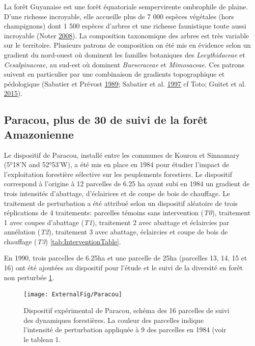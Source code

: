 \documentclass[11pt,french,A4paper,extrafontsizes,onecolumn,openright]{memoir}
\begin{document}
La forêt Guyanaise est une forêt équatoriale sempervirente ombrophile de
plaine. D'une richesse incroyable, elle accueille plus de 7 000 espèces
végétales (hors champignons) dont 1 500 espèces d'arbres et une richesse
faunistique toute aussi incroyable (Noter
\protect\hyperlink{ref-DeNoter2008}{2008}). La composition taxonomique
des arbres est très variable sur le territoire. Plusieurs patrons de
composition on été mis en évidence selon un gradient du nord-ouest où
dominent les familles botaniques des \emph{Lecythidaceae} et
\emph{Cesalpinaceae}, au sud-est où dominent \emph{Burseraceae} et
\emph{Mimosaceae}. Ces patrons suivent en particulier par une
combinaison de gradients topographique et pédologique (Sabatier et
Prévost \protect\hyperlink{ref-Sabatier1989}{1989}; Sabatier et al.
\protect\hyperlink{ref-Sabatier1997}{1997} cf Toto; Guitet et al.
\protect\hyperlink{ref-Guitet2015}{2015}).

\subsection{Paracou, plus de 30 de suivi de la forêt
Amazonienne}\label{paracou-plus-de-30-de-suivi-de-la-foret-amazonienne}

Le dispositif de Paracou, installé entre les communes de Kourou et
Sinnamary (5°18'N and 52°53'W), a été mis en place en 1984 pour étudier
l'impact de l'exploitation forestière sélective sur les peuplements
forestiers. Le dispositif correspond à l'origine à 12 parcelles de 6.25
ha ayant subi en 1984 un gradient de trois intensités d'abattage,
d'éclairices et de coupe de bois de chauffage. Le traitement de
perturbation a été attribué selon un dispositif aléatoire de trois
réplications de 4 traitements: parcelles témoins sans intervention
(\emph{T0}), traitement 1 avec coupes d'abattage (\emph{T1}), traitement
2 avec abattage et éclaircies par annélation (\emph{T2}), traitement 3
avec abattage, éclaircies et coupe de bois de chauffage (\emph{T3})
\ref{tab:InterventionTable}.

En 1990, trois parcelles de 6.25ha et une parcelle de 25ha (parcelles
13, 14, 15 et 16) ont été ajoutées au dispositif pour l'étude et le
suivi de la diversité en forêt non perturbée \ref{fig:ParacouDesign}.

\begin{figure}

{\centering \texttt{[image: ExternalFig/Paracou]} 

}

\caption{Dispositif expérimental de Paracou, schéma des 16 parcelles de suivi des dynamiques forestières. La couleur des parcelles indique l'intensité de perturbation appliquée à 9 des parcelles en 1984 (voir le tableau 1.}\label{fig:ParacouDesign}
\end{figure}
\end{document}
